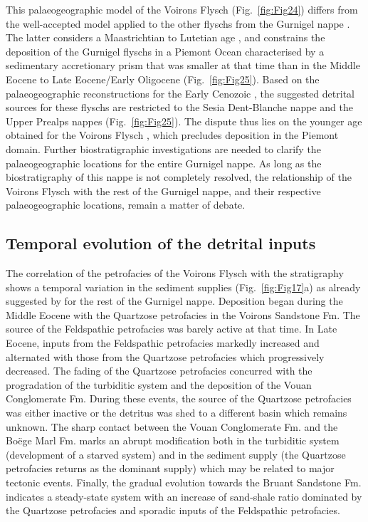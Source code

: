 \documentclass[twoside]{article}
\begin{document}
This palaeogeographic model of the Voirons Flysch (Fig.~\ref{fig:Fig24}) differs from the well-accepted model applied to the other flyschs from the Gurnigel nappe \citep{Winkler1983,Winkler1984,Caron1989}. The latter considers a Maastrichtian to Lutetian age \citep{Stuijvenberg1979,Stuijvenberg1980b,Winkler1983,Winkler1984}, and constrains the deposition of the Gurnigel flyschs in a Piemont Ocean characterised by a sedimentary accretionary prism that was smaller at that time than in the Middle Eocene to Late Eocene/Early Oligocene (Fig.~\ref{fig:Fig25}). Based on the palaeogeographic reconstructions for the Early Cenozoic \citep{Schmid1996,Handy2010}, the suggested detrital sources for these flyschs are restricted to the Sesia Dent-Blanche nappe and the Upper Prealps nappes (Fig.~\ref{fig:Fig25}). The dispute thus lies on the younger age obtained for the Voirons Flysch \citep{Ujetz1996,Ospina-Ostios2013}, which precludes deposition in the Piemont domain. Further biostratigraphic investigations are needed to clarify the palaeogeographic locations for the entire Gurnigel nappe. As long as the biostratigraphy of this nappe is not completely resolved, the relationship of the Voirons Flysch with the rest of the Gurnigel nappe, and their respective palaeogeographic locations, remain a matter of debate.

\subsection{Temporal evolution of the detrital inputs}

The correlation of the petrofacies of the Voirons Flysch with the stratigraphy shows a temporal variation in the sediment supplies (Fig.~\ref{fig:Fig17}a) as already suggested by \citep{Winkler1984} for the rest of the Gurnigel nappe. Deposition began during the Middle Eocene with the Quartzose petrofacies in the Voirons Sandstone Fm. The source of the Feldspathic petrofacies was barely active at that time. In Late Eocene, inputs from the Feldspathic petrofacies markedly increased and alternated with those from the Quartzose petrofacies which progressively decreased. The fading of the Quartzose petrofacies concurred with the progradation of the turbiditic system and the deposition of the Vouan Conglomerate Fm. During these events, the source of the Quartzose petrofacies was either inactive or the detritus was shed to a different basin which remains unknown. The sharp contact between the Vouan Conglomerate Fm. and the Boëge Marl Fm. marks an abrupt modification both in the turbiditic system (development of a starved system) and in the sediment supply (the Quartzose petrofacies returns as the dominant supply) which may be related to major tectonic events. Finally, the gradual evolution towards the Bruant Sandstone Fm. indicates a steady-state system with an increase of sand-shale ratio dominated by the Quartzose petrofacies and sporadic inputs of the Feldspathic petrofacies.
\end{document}
